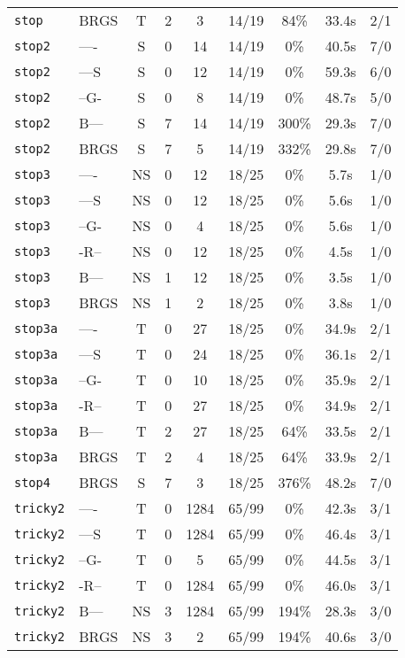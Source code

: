 \begin{tabular}{llccccccc}
\texttt{stop} & BRGS & T & 2 & 3 & 14/19 & 84\% & 33.4s & 2/1 \\
\texttt{stop2} & ---- & S & 0 & 14 & 14/19 & 0\% & 40.5s & 7/0 \\
\texttt{stop2} & ---S & S & 0 & 12 & 14/19 & 0\% & 59.3s & 6/0 \\
\texttt{stop2} & --G- & S & 0 & 8 & 14/19 & 0\% & 48.7s & 5/0 \\
\texttt{stop2} & B--- & S & 7 & 14 & 14/19 & 300\% & 29.3s & 7/0 \\
\texttt{stop2} & BRGS & S & 7 & 5 & 14/19 & 332\% & 29.8s & 7/0 \\
\texttt{stop3} & ---- & NS & 0 & 12 & 18/25 & 0\% & 5.7s & 1/0 \\
\texttt{stop3} & ---S & NS & 0 & 12 & 18/25 & 0\% & 5.6s & 1/0 \\
\texttt{stop3} & --G- & NS & 0 & 4 & 18/25 & 0\% & 5.6s & 1/0 \\
\texttt{stop3} & -R-- & NS & 0 & 12 & 18/25 & 0\% & 4.5s & 1/0 \\
\texttt{stop3} & B--- & NS & 1 & 12 & 18/25 & 0\% & 3.5s & 1/0 \\
\texttt{stop3} & BRGS & NS & 1 & 2 & 18/25 & 0\% & 3.8s & 1/0 \\
\texttt{stop3a} & ---- & T & 0 & 27 & 18/25 & 0\% & 34.9s & 2/1 \\
\texttt{stop3a} & ---S & T & 0 & 24 & 18/25 & 0\% & 36.1s & 2/1 \\
\texttt{stop3a} & --G- & T & 0 & 10 & 18/25 & 0\% & 35.9s & 2/1 \\
\texttt{stop3a} & -R-- & T & 0 & 27 & 18/25 & 0\% & 34.9s & 2/1 \\
\texttt{stop3a} & B--- & T & 2 & 27 & 18/25 & 64\% & 33.5s & 2/1 \\
\texttt{stop3a} & BRGS & T & 2 & 4 & 18/25 & 64\% & 33.9s & 2/1 \\
\texttt{stop4} & BRGS & S & 7 & 3 & 18/25 & 376\% & 48.2s & 7/0 \\
\texttt{tricky2} & ---- & T & 0 & 1284 & 65/99 & 0\% & 42.3s & 3/1 \\
\texttt{tricky2} & ---S & T & 0 & 1284 & 65/99 & 0\% & 46.4s & 3/1 \\
\texttt{tricky2} & --G- & T & 0 & 5 & 65/99 & 0\% & 44.5s & 3/1 \\
\texttt{tricky2} & -R-- & T & 0 & 1284 & 65/99 & 0\% & 46.0s & 3/1 \\
\texttt{tricky2} & B--- & NS & 3 & 1284 & 65/99 & 194\% & 28.3s & 3/0 \\
\texttt{tricky2} & BRGS & NS & 3 & 2 & 65/99 & 194\% & 40.6s & 3/0 \\

\end{tabular}
